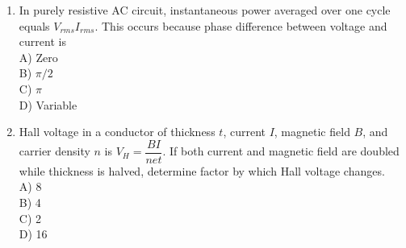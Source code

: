 \documentclass[12pt]{article}
\begin{document}
\begin{enumerate}
A) Net magnetic flux remains constant\\

B) Magnetic force zero\\

C) Resistance infinite\\

D) Electric field absent

\item In purely resistive AC circuit, instantaneous power averaged over one cycle equals $V_{rms}I_{rms}$. This occurs because phase difference between voltage and current is\\

A) Zero\\

B) $\pi/2$\\

C) $\pi$\\

D) Variable

\item Hall voltage in a conductor of thickness $t$, current $I$, magnetic field $B$, and carrier density $n$ is $V_H=\dfrac{BI}{net}$. If both current and magnetic field are doubled while thickness is halved, determine factor by which Hall voltage changes.\\

A) 8\\

B) 4\\

C) 2\\

D) 16

\end{enumerate}
\end{document}
